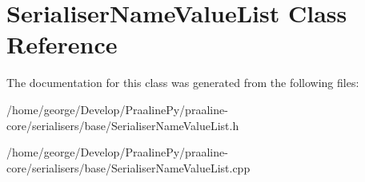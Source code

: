 \hypertarget{class_serialiser_name_value_list}{}\section{Serialiser\+Name\+Value\+List Class Reference}
\label{class_serialiser_name_value_list}


The documentation for this class was generated from the following files\+:\begin{DoxyCompactItemize}
\item 
/home/george/\+Develop/\+Praaline\+Py/praaline-\/core/serialisers/base/Serialiser\+Name\+Value\+List.\+h\item 
/home/george/\+Develop/\+Praaline\+Py/praaline-\/core/serialisers/base/Serialiser\+Name\+Value\+List.\+cpp\end{DoxyCompactItemize}
